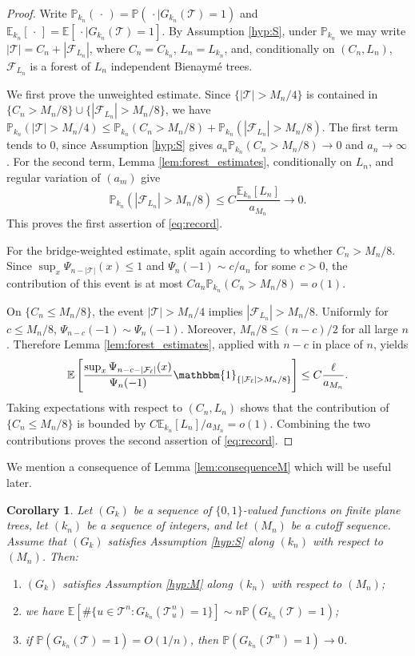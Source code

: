 \documentclass[a4paper,11pt]{article}
\newtheorem{corollary}[theorem]{Corollary}
\newcommand{\E}{\mathbb{E}}
\DeclareRobustCommand{\P}{\mathbb{P}}
\DeclareRobustCommand{\1}{\mathbf{1}}
\begin{document}
\begin{proof}
Write $
  \P_{k_n}(\,\cdot\,)
  =
  \P(\,\cdot\mid G_{k_n}(\mathcal T)=1)$ and   $\E_{k_n}[\,\cdot\,]
  =
  \E[\,\cdot\mid G_{k_n}(\mathcal T)=1]$.
By Assumption \ref{hyp:S}, under $\P_{k_n}$ we may write
$|\mathcal T|=C_n+|\mathcal F_{L_n}|$, where
$C_n=C_{k_n}$, $L_n=L_{k_n}$, and, conditionally on $(C_n,L_n)$,
$\mathcal F_{L_n}$ is a forest of $L_n$ independent Bienaym\'e trees.

We first prove the unweighted estimate. Since
$\{|\mathcal T|>M_n/4\}$ is contained in
$\{C_n>M_n/8\}\cup\{|\mathcal F_{L_n}|>M_n/8\}$, we have
$
  \P_{k_n}(|\mathcal T|>M_n/4)
  \le
  \P_{k_n}(C_n>M_n/8)
  +
  \P_{k_n}(|\mathcal F_{L_n}|>M_n/8)$.
The first term tends to $0$, since Assumption \ref{hyp:S} gives
$a_n\P_{k_n}(C_n>M_n/8)\to0$ and $a_n\to\infty$. For the second term,
Lemma \ref{lem:forest_estimates}, conditionally on $L_n$, and regular
variation of $(a_m)$ give
\[
  \P_{k_n}(|\mathcal F_{L_n}|>M_n/8)
  \le
  C\frac{\E_{k_n}[L_n]}{a_{M_n}}
  \longrightarrow0.
\]
This proves the first assertion of \eqref{eq:record}.

For the bridge-weighted estimate, split again according to whether
$C_n>M_n/8$. Since $\sup_x\Psi_{n-|\mathcal T|}(x)\le1$ and
$\Psi_n(-1)\sim c/a_{n}$ for some $c>0$, the contribution of this event is at most
$Ca_n\P_{k_n}(C_n>M_n/8)=o(1)$.

On $\{C_n\le M_n/8\}$, the event $|\mathcal T|>M_n/4$ implies
$|\mathcal F_{L_n}|>M_n/8$. Uniformly for $c\le M_n/8$, 
$\Psi_{n-c}(-1)\sim \Psi_n(-1)$. Moreover, $M_n/8\le (n-c)/2$ for all large
$n$. Therefore Lemma \ref{lem:forest_estimates}, applied with $n-c$ in place
of $n$, yields
\[
  \E\left[
    \frac{\sup_x\Psi_{n-c-|\mathcal F_\ell|}(x)}{\Psi_n(-1)}
    \mathbbm{1}_{\{|\mathcal F_\ell|>M_n/8\}}
  \right]
  \le
  C\frac{\ell}{a_{M_n}}.
\]
Taking expectations with respect to $(C_n,L_n)$ shows that the contribution
of $\{C_n\le M_n/8\}$ is bounded by
$C\E_{k_n}[L_n]/a_{M_n}=o(1)$. Combining the two contributions proves the
second assertion of \eqref{eq:record}.
\end{proof}


 We  mention a  consequence of Lemma \ref{lem:consequenceM} which will be useful later.
 
\begin{corollary}
\label{cor:SM}
Let $(G_k)$ be a sequence of $\{0,1\}$-valued functions on finite plane
trees, let $(k_n)$ be a sequence of integers, and let $(M_n)$ be a cutoff
sequence. Assume that $(G_k)$ satisfies Assumption \ref{hyp:S} along $(k_n)$
with respect to $(M_n)$. Then:
\begin{enumerate}
\item[(i)] $(G_k)$ satisfies Assumption \ref{hyp:M} along $(k_n)$ with
respect to $(M_n)$;
\item[(ii)] we have
$
\E\left[
\#\{u\in\mathcal T^n:G_{k_n}(\mathcal T^n_u)=1\}
\right]
\sim
n\P(G_{k_n}(\mathcal T)=1)
$;
\item[(iii)] if $\P(G_{k_n}(\mathcal T)=1)=O(1/n)$, then
$\P(G_{k_n}(\mathcal T^n)=1)\to0$.
\end{enumerate}
\end{corollary}
\end{document}
